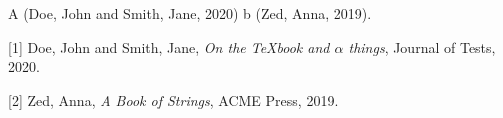 A (Doe, John and Smith, Jane, 2020) b (Zed, Anna, 2019).

\noindent
{[}1] Doe, John and Smith, Jane, \emph{On the {TeX}book and $\alpha$ \alpha{} things}, Journal of Tests, 2020.

\noindent
{[}2] Zed, Anna, \emph{A Book of Strings}, ACME Press, 2019.
